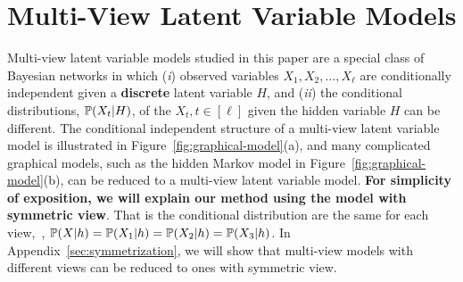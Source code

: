 \documentclass{article}
\begin{document}
\vspace{-3mm}
\section{Multi-View Latent Variable Models}
\vspace{-2mm}

Multi-view latent variable models studied in this paper are a
special class of Bayesian networks in which
({\it i}) observed variables $X_1, X_2, \ldots, X_\ell$ are conditionally independent given a {\bf discrete} latent variable $H$, and
({\it ii}) the conditional distributions, $\mathbb{P}(X_t|H)$, of the $X_t, t \in [\ell]$ given the hidden variable $H$ can be different.
The conditional independent structure of a multi-view latent variable model is illustrated in Figure~\ref{fig:graphical-model}(a), and many complicated graphical models, such as the hidden Markov model in Figure~\ref{fig:graphical-model}(b), can be reduced to a multi-view latent variable model. {\bf For simplicity of exposition, we will explain our method using the model with symmetric view}. That is the conditional distribution are the same for each view,~\ie, $\mathbb{P}(X|h) = \mathbb{P}(X_1|h) =  \mathbb{P}(X_2|h) =\mathbb{P}(X_3|h)$. In Appendix~\ref{sec:symmetrization}, we will show that multi-view models with different views can be reduced to ones with symmetric view.
\end{document}
